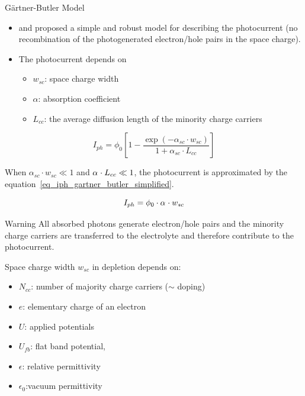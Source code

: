 \documentclass[10pt,compress]{beamer}
\begin{document}
    \begin{frame}[allowframebreaks=1.0]{Gärtner-Butler Model}
        \begin{itemize} 
        \item \citet{gartner1959} and \citet{butler1977} proposed a simple and robust model for 
              describing the photocurrent (no recombination of the photogenerated electron/hole pairs in the space charge).
        \item The photocurrent depends on  
            \begin{itemize}
                \item $w_{sc}$: space charge width 
                \item $\alpha$: absorption coefficient
                \item $L_{cc }$: the average diffusion length of the minority charge carriers
            \end{itemize}
        \end{itemize}

        \begin{equation}
            I_{ph} = \phi _0 \left[ 1 - \frac{\exp (-\alpha _{sc} \cdot w_{sc})}{1+\alpha _{sc} \cdot
            L_{cc}} \right]
            \label{eq_iph_gartner_butler}
        \end{equation}
        
        When $\alpha _{sc} \cdot w_{sc} \ll 1$ and $\alpha _{\sc} \cdot L_{cc} \ll 1$, 
        the photocurrent is approximated by the 
        equation~\ref{eq_iph_gartner_butler_simplified}.

        \begin{equation}
            I_{ph} = \phi _0 \cdot \alpha _{\sc} \cdot w_{sc}
            \label{eq_iph_gartner_butler_simplified}
        \end{equation}
        
        \footnotesize
        \begin{alertblock}{Warning}
            All absorbed photons generate electron/hole pairs and 
            the minority charge carriers are transferred to the electrolyte and 
            therefore contribute to the photocurrent.
        \end{alertblock}

        \framebreak
        Space charge width $w_{sc}$ in depletion depends on:
        \begin{itemize}
            \item $N_{cc}$: number of majority charge carriers ($\sim$ doping) 
            \item $e$: elementary charge of an electron 
            \item $U$: applied potentials
            \item $U_{fb}$: flat band potential,
            \item $\epsilon$: relative permittivity
            \item $\epsilon _0$:vacuum permittivity
        \end{itemize}


\end{frame}
\end{document}
